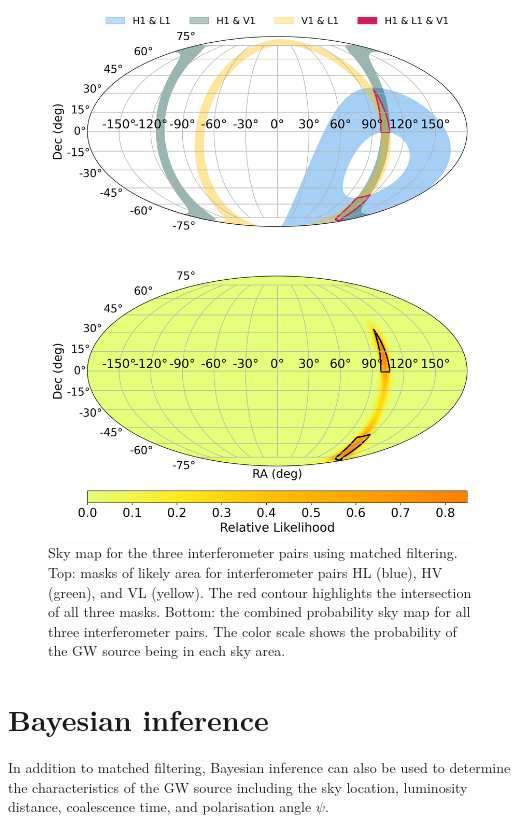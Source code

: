 \documentclass[11pt,a4paper]{article}
\begin{document}
\begin{figure}
    \includegraphics[width=\columnwidth, keepaspectratio]{../figures/detector_skymap_intersection.png}
    \caption{Sky map for the three interferometer pairs using matched filtering. Top: masks of likely area for interferometer pairs HL (blue), HV (green), and VL (yellow). The red contour highlights the intersection of all three masks. Bottom: the combined probability sky map for all three interferometer pairs. The color scale shows the probability of the GW source being in each sky area.}
    \label{fig:skymap_hlv_mf}
\end{figure}

\clearpage
\section{Bayesian inference}
\label{sec:bayesian}
In addition to matched filtering, Bayesian inference can also be used to determine the characteristics of the GW source including the sky location, luminosity distance, coalescence time, and polarisation angle $\psi$.
\end{document}
